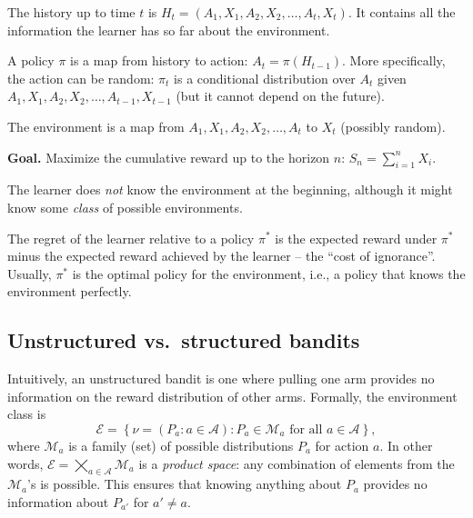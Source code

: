 \begin{definition}[History]
The history up to time $t$ is $H_t = (A_1, X_1, A_2, X_2, \dots, A_t, X_t)$. It contains all the information the learner has so far about the environment.
\end{definition}

\begin{definition}[Policy]
A policy $\pi$ is a map from history to action: $A_t = \pi(H_{t-1})$. More specifically, the action can be random: $\pi_t$ is a conditional distribution over $A_t$ given $A_1, X_1, A_2, X_2, \dots, A_{t-1}, X_{t-1}$ (but it cannot depend on the future).
\end{definition}

\begin{definition}[Environment]
The environment is a map from $A_1, X_1, A_2, X_2, \dots, A_t$ to $X_t$ (possibly random).
\end{definition}

\textbf{Goal.} Maximize the cumulative reward up to the horizon $n$: $S_n = \sum_{i=1}^n X_i$.

\begin{remark}
The learner does \emph{not} know the environment at the beginning, although it might know some \emph{class} of possible environments.
\end{remark}

\begin{definition}[Regret]
The regret of the learner relative to a policy $\pi^*$ is the expected reward under $\pi^*$ minus the expected reward achieved by the learner -- the ``cost of ignorance''. Usually, $\pi^*$ is the optimal policy for the environment, i.e., a policy that knows the environment perfectly.
\end{definition}

\subsection{Unstructured vs.\ structured bandits}

\begin{definition}
Intuitively, an unstructured bandit is one where pulling one arm provides no information on the reward distribution of other arms. Formally, the environment class is
\[
\mathcal{E} = \left\{ \nu = (P_a : a \in \mathcal{A}) : P_a \in \mathcal{M}_a \text{ for all } a \in \mathcal{A} \right\},
\]
where $\mathcal{M}_a$ is a family (set) of possible distributions $P_a$ for action $a$. In other words, $\mathcal{E} = \bigtimes_{a \in \mathcal{A}} \mathcal{M}_a$ is a \emph{product space}: any combination of elements from the $\mathcal{M}_a$'s is possible. This ensures that knowing anything about $P_a$ provides no information about $P_{a'}$ for $a' \neq a$.
\end{definition}

